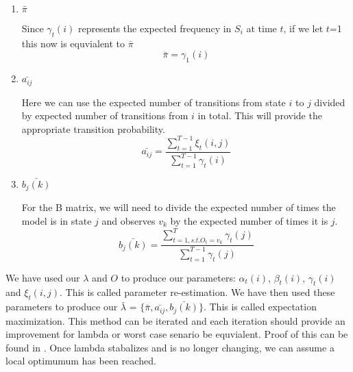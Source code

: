     \begin{enumerate}[i]
        \label{Hidden_Markov:Learning:Baum_Welch:Reestimation}
        \item $\bar{\pi}$ 
        
        Since $\gamma_t(i)$ represents the expected frequency in $S_i$ at time $t$, if we let $t$=1 this now is equvialent to $\bar{\pi}$
        \begin{equation}
            \bar{\pi} = \gamma_1(i)
        \end{equation}

        \item $\bar{a_{ij}}$
        
        Here we can use the expected number of transitions from state $i$ to $j$ divided by expected number of transitions from $i$ in total. This will provide the appropriate transition probability. 
        \begin{equation}
            \bar{a_{ij}} = \dfrac{\sum_{t=1}^{T-1} \xi_t(i,j)}{\sum_{t=1}^{T-1} \gamma_t(i)}
        \end{equation}

        \item $\bar{b_j(k)}$
        
        For the B matrix, we will need to divide the expected number of times the model is in state $j$ and observes $v_k$ by the expected number of times it is $j$.
        \begin{equation}
            \bar{b_j(k)} = \dfrac{\sum_{t=1, s.t. O_t = v_k}^T \gamma_t(j)}{\sum_{t=1}^{T-1} \gamma_t(j)}
        \end{equation} 
    \end{enumerate}

    We have used our $\lambda$ and $O$ to produce our parameters: $\alpha_t(i)$, $\beta_t(i)$, $\gamma_t(i)$ and $\xi_t(i,j)$. This is called parameter re-estimation. We have then used these parameters to produce our $\bar{\lambda}$ = $\{\bar{\pi}, \bar{a_{ij}}, \bar{b_j(k)} \}$. This is called expectation maximization. This method can be iterated and each iteration should provide an improvement for lambda or worst case senario be equvialent. Proof of this can be found in \cite{Baum}.  Once lambda stabalizes and is no longer changing, we can assume a local optimumum has been reached. 

